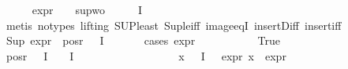 \begin{isabellebody}
\ \ \ \ \isamarkupfalse%
\ {\isacartoucheopen}expr{\isacharunderscore}{\kern0pt}{}\ {\isasympsi}\ {\isasymle}\ {}{\isacartoucheclose}\ sup{\isacharunderscore}{\kern0pt}wo{\isacharunderscore}{\kern0pt}{\isasympsi}{\isacharparenleft}{\kern0pt}{}{\isacharparenright}{\kern0pt}\ \ {\isacartoucheopen}{\isasympsi}\ {\isasymin}\ {\isasymPhi}\ {\isacharbackquote}{\kern0pt}\ I{\isacartoucheclose}\isanewline
\ \ \ \ \isamarkupfalse%
\ {\isacharparenleft}{\kern0pt}metis\ {\isacharparenleft}{\kern0pt}no{\isacharunderscore}{\kern0pt}types{\isacharcomma}{\kern0pt}\ lifting{\isacharparenright}{\kern0pt}\ SUP{\isacharunderscore}{\kern0pt}least\ Sup{\isacharunderscore}{\kern0pt}le{\isacharunderscore}{\kern0pt}iff\ image{\isacharunderscore}{\kern0pt}eqI\ insert{\isacharunderscore}{\kern0pt}Diff\ insert{\isacharunderscore}{\kern0pt}iff{\isacharparenright}{\kern0pt}\isanewline
\isanewline
\isanewline
\ \ \isamarkupfalse%
\ {\isachardoublequoteopen}Sup\ {\isacharparenleft}{\kern0pt}expr{\isacharunderscore}{\kern0pt}{}\ {\isacharbackquote}{\kern0pt}\ {\isacharparenleft}{\kern0pt}pos{\isacharunderscore}{\kern0pt}r\ {\isacharparenleft}{\kern0pt}{\isasymPhi}\ {\isacharbackquote}{\kern0pt}\ I{\isacharparenright}{\kern0pt}{\isacharparenright}{\kern0pt}{\isacharparenright}{\kern0pt}\ {\isasymle}\ {}{\isachardoublequoteclose}\isanewline
\ \ \ \ \isamarkupfalse%
{\isacharparenleft}{\kern0pt}cases\ {\isachardoublequoteopen}expr{\isacharunderscore}{\kern0pt}{}\ {\isasympsi}\ {\isasymge}\ {}{\isachardoublequoteclose}{\isacharparenright}{\kern0pt}\isanewline
\ \ \ \ \ \ \isamarkupfalse%
\ True\isanewline
\ \ \ \ \ \ \isamarkupfalse%
\ {\isachardoublequoteopen}pos{\isacharunderscore}{\kern0pt}r\ {\isacharparenleft}{\kern0pt}{\isasymPhi}\ {\isacharbackquote}{\kern0pt}\ I{\isacharparenright}{\kern0pt}\ {\isacharequal}{\kern0pt}\ {\isacharparenleft}{\kern0pt}{\isasymPhi}\ {\isacharbackquote}{\kern0pt}\ I{\isacharparenright}{\kern0pt}\ {\isacharminus}{\kern0pt}\ {\isacharbraceleft}{\kern0pt}{\isasympsi}{\isacharbraceright}{\kern0pt}{\isachardoublequoteclose}\isanewline
\ \ \ \ \ \ \isamarkupfalse%
{\isacharminus}{\kern0pt}\isanewline
\ \ \ \ \ \ \ \ \isamarkupfalse%
\ {\isachardoublequoteopen}{\isasymforall}x{\isasymin}\ {\isacharparenleft}{\kern0pt}{\isasymPhi}\ {\isacharbackquote}{\kern0pt}\ I{\isacharparenright}{\kern0pt}\ {\isacharminus}{\kern0pt}\ {\isacharbraceleft}{\kern0pt}{\isasympsi}{\isacharbraceright}{\kern0pt}{\isachardot}{\kern0pt}\ expr{\isacharunderscore}{\kern0pt}{}\ x\ {\isacharless}{\kern0pt}\ expr{\isacharunderscore}{\kern0pt}{}\ {\isasympsi}{\isachardoublequoteclose}\isanewline

\end{isabellebody}
